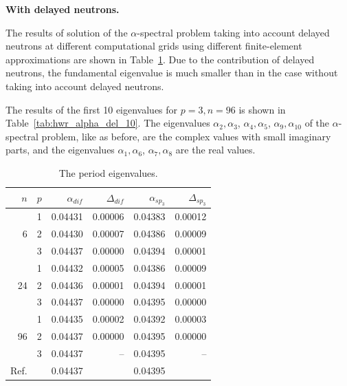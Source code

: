\documentclass[authoryear]{elsarticle}
\begin{document}
\textbf{With delayed neutrons.}

The results of solution of the $\alpha$-spectral problem taking into account delayed neutrons at different computational grids using different finite-element approximations are shown in Table~\ref{tab:hwr_alpha_del}. 
Due to the contribution of delayed neutrons, the fundamental eigenvalue is much smaller than in the case without taking into account delayed neutrons.

The results of the first 10 eigenvalues for $p = 3, n = 96 $ is shown in Table~\ref{tab:hwr_alpha_del_10}.
The eigenvalues $\alpha_2, \alpha_3$, $\alpha_4, \alpha_5$, $\alpha_9, \alpha_{10}$ of the $\alpha$-spectral problem, like as before, are the complex values with small imaginary parts, and the eigenvalues $\alpha_1, \alpha_6$, $\alpha_7, \alpha_8$ are the real values.

\begin{table}[h]
\caption{The period eigenvalues.}
\label{tab:hwr_alpha_del}
\begin{center}
\begin{tabular}{rrrrrr}
\hline
$n$ & $p$ & $\alpha_{dif}$ & $\Delta_{dif}$ &$\alpha_{sp_3}$& $\Delta_{sp_3}$ \\
\hline
	& 1	&0.04431 & 0.00006 & 0.04383 & 0.00012\\
6	& 2	&0.04430 & 0.00007 & 0.04386 & 0.00009\\
	& 3	&0.04437 & 0.00000 & 0.04394 & 0.00001\\ 
\hline
	& 1	&0.04432 & 0.00005 & 0.04386 & 0.00009\\
24& 2	&0.04436 & 0.00001 & 0.04394 & 0.00001\\
	& 3	&0.04437 & 0.00000 & 0.04395 & 0.00000\\ 
\hline
	& 1	&0.04435 & 0.00002 & 0.04392 & 0.00003\\
96& 2	&0.04437 & 0.00000 & 0.04395 & 0.00000\\
	& 3	&0.04437 & --      & 0.04395 & -- \\ 
\hline
Ref.& & 0.04437 & & 0.04395 \\ 
\hline
\end{tabular}
\end{center}
\end{table}
\end{document}
